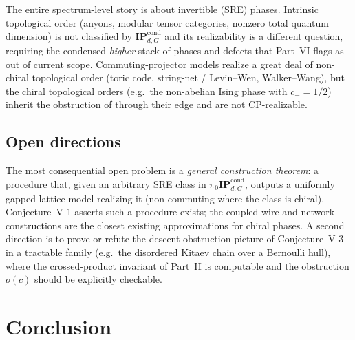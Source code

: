 \documentclass[12pt]{article}
\newcommand{\IPcond}{\mathbf{IP}^{\mathrm{cond}}}  %
\newcommand{\CP}{\mathrm{CP}}                    %
\theoremstyle{definition}
\theoremstyle{remark}
\begin{document}
The entire spectrum-level story is about invertible (SRE) phases. Intrinsic topological order
(anyons, modular tensor categories, nonzero total quantum dimension) is not classified
by $\IPcond_{d,G}$ and its realizability is a different question, requiring the condensed
\emph{higher} stack of phases and defects that Part~VI flags as out of current scope.
Commuting-projector models realize a great deal of non-chiral topological order (toric code,
string-net / Levin--Wen, Walker--Wang), but the chiral topological orders (e.g.\ the
non-abelian Ising phase with $c_-=1/2$) inherit the obstruction of  through
their edge and are not $\CP$-realizable.

\subsection{Open directions}

The most consequential open problem is a \emph{general construction theorem}: a procedure
that, given an arbitrary SRE class in $\pi_0\IPcond_{d,G}$, outputs a uniformly gapped
lattice model realizing it (non-commuting where the class is chiral). Conjecture~V-1 asserts
such a procedure exists; the coupled-wire and network constructions are the closest existing
approximations for chiral phases. A second direction is to prove or refute the descent
obstruction picture of Conjecture~V-3 in a tractable family (e.g.\ the disordered Kitaev
chain over a Bernoulli hull), where the crossed-product invariant of Part~II is computable and
the obstruction $o(c)$ should be explicitly checkable.

\section{Conclusion}
\label{sec:conclusion}
\end{document}
